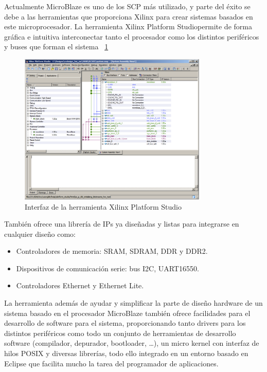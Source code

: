 Actualmente MicroBlaze es uno de los SCP más utilizado, y parte del éxito se debe
a las herramientas que proporciona Xilinx para crear sistemas basados en este
microprocesador. La herramienta Xilinx Platform Studio\cite{Etiqueta26}permite de forma gráfica e
intuitiva interconectar tanto el procesador como los distintos periféricos y buses que forman
el sistema
~\ref{fig:Xilinx Platform Studio}

\begin{figure}[h!]
 	\begin{center}
  	\includegraphics[width=0.8\textwidth,keepaspectratio=true]{./images/herramientaxps}
  	\caption{Interfaz de la herramienta Xilinx Platform Studio}
  	\label{fig:Xilinx Platform Studio}
 	\end{center}
	\end{figure}

También ofrece una librería de IPs ya diseñadas y listas para integrarse en cualquier diseño como:

		\begin{itemize}
		  \item  Controladores de memoria: SRAM, SDRAM, DDR y DDR2.
	 	 \item  Dispositivos de comunicación serie: bus I2C, UART16550.
	 	 \item Controladores Ethernet y Ethernet Lite.
		\end{itemize}

La herramienta además de ayudar y simplificar la parte de diseño hardware de un sistema basado en el procesador MicroBlaze también ofrece facilidades para el desarrollo de software para el sistema, proporcionando tanto drivers para los distintos periféricos como todo un conjunto de herramientas de desarrollo software (compilador, depurador, bootloader, …), un micro kernel con interfaz de hilos POSIX y diversas librerías, todo ello integrado en un entorno basado en Eclipse\cite{Etiqueta27} que facilita mucho la tarea del programador de aplicaciones.

